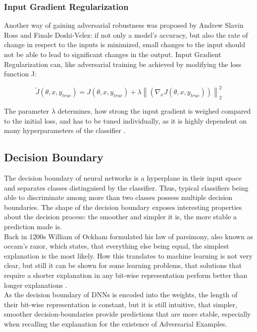 \documentclass[draft,final]{vutinfth} %
\newcommand{\norm}[1]{\left\lVert#1\right\rVert}
\begin{document}
\subsubsection{Input Gradient Regularization}

Another way of gaining adversarial robustness was proposed by Andrew Slavin Ross and Finale Doshi-Velez: if not only a model's accuracy, but also the rate of change in respect to the inputs is minimized, small changes to the input should not be able to lead to significant changes in the output. 
Input Gradient Regularization can, like adversarial training be achieved by modifying the loss function J:

\begin{equation}
	\tilde{J}(\theta, x, y_{true}) = J(\theta, x, y_{true}) + \lambda \norm{(\nabla_x J(\theta, x, y_{true}))}_2^2
\end{equation}

The parameter $\lambda$ determines, how strong the input gradient is weighed compared to the initial loss, and has to be tuned individually, as it is highly dependent on many hyperparameters of the classifier \cite{Ross2017}.

\subsection{Decision Boundary}

The decision boundary of neural networks is a hyperplane in their input space and separates classes distinguised by the classifier.
Thus, typical classifiers being able to discriminate among more than two classes possess multiple decision boundaries.
The shape of the decision boundary exposes interesting properties about the decision process: the smoother and simpler it is, the more stable a prediction made is.\\
Back in 1200s William of Ockham formulated his law of parsimony, also known as occam’s razor, which states, that everything else being equal, the simplest explanation is the most likely. 
How this translates to machine learning is not very clear, but still it can be shown for some learning problems, that solutions that require a shorter explanation in any bit-wise representation perform better than longer explanations \cite{Blumer1987}.\\
As the decision boundary of DNNs is encoded into the weights, the length of their bit-wise representation is constant, but it is still intuitive, that simpler, smoother decision-boundaries provide predictions that are more stable, especially when recalling the explanation for the existence of Adversarial Examples.
\end{document}
